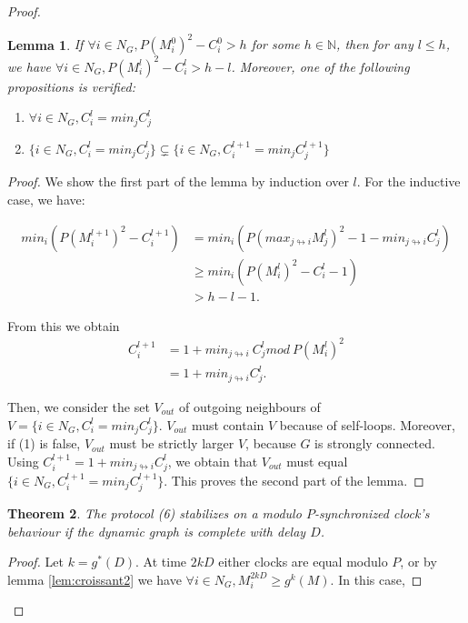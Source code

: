 \documentclass[11pt,letterpaper]{article}
\newtheorem{thm}{Theorem}
\newtheorem{lem}[thm]{Lemma}
\begin{document}
\begin{proof}
\begin{lem} \label{lem:growing_set}
	If $\forall i \in N_G, P(M_i^0)^2 - C_i^0 > h$ for some $h \in \mathds{N}$, then for any $l \leq h$,
	we have $\forall i \in N_G, P(M_i^l)^2 - C_i^l > h - l$.
	Moreover, one of the following propositions is verified:
	\begin{enumerate}
		\item $\forall i \in N_G, C_i^l = min_j C_j^l$
		\item $\{i \in N_G, C_i^l = min_j C_j^l\} \subsetneq \{i \in N_G, C_i^{l+1} = min_j C_j^{l+1}\}$
	\end{enumerate}
\end{lem}
\begin{proof}
	We show the first part of the lemma by induction over $l$.
	For the inductive case, we have:

	\begin{align*}
		min_i (P(M_i^{l+1})^2 - C_i^{l+1}) &= min_i (P(max_{j \looparrowright i} M_j^l)^2 - 1 - min_{j \looparrowright i} C_j^l) \\
		& \geq min_i (P(M_i^l)^2 - C_i^l - 1) \\
		& > h - l - 1.
	\end{align*}

	From this we obtain 
	\begin{align*}
		C_i^{l+1} &= 1+min_{j \looparrowright i}~C_j^l mod~P(M_i^l)^2 \\
		&= 1+min_{j \looparrowright i} C_j^l.
	\end{align*}

	Then, we consider the set $V_{out}$ of outgoing neighbours of $V = \{i \in N_G, C_i^l = min_j C_j^l\}$.
	$V_{out}$ must contain $V$ because of self-loops.
	Moreover, if (1) is false, $V_{out}$ must be strictly larger $V$, because $G$ is strongly connected.
	Using $C_i^{l+1} = 1+min_{j \looparrowright i} C_j^l$,
	we obtain that $V_{out}$ must equal $\{i \in N_G, C_i^{l+1} = min_j C_j^{l+1}\}$.
	This proves the second part of the lemma.
\end{proof}

\begin{thm}
	The protocol (6) stabilizes on a modulo $P$-synchronized clock's behaviour if the dynamic graph is complete with delay $D$.
\end{thm}
\begin{proof}
	Let $k = g^*(D)$.
	At time $2kD$ either clocks are equal
	modulo $P$, or by lemma \ref{lem:croissant2} we have $\forall i \in N_G, M_i^{2kD} \geq g^k(M)$.
	In this case,


\end{proof}
\end{proof}
\end{document}
